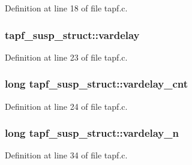 Definition at line 18 of file tapf.\+c.

\subsubsection[{\texorpdfstring{vardelay}{vardelay}}]{ tapf\+\_\+susp\+\_\+struct\+::vardelay}\hypertarget{structtapf__susp__struct_a27dd6d901a5671ea2fc0117f42d63052}{}\label{structtapf__susp__struct_a27dd6d901a5671ea2fc0117f42d63052}


Definition at line 23 of file tapf.\+c.

\subsubsection[{\texorpdfstring{vardelay\+\_\+cnt}{vardelay_cnt}}]{\setlength{\rightskip}{0pt plus 5cm}long tapf\+\_\+susp\+\_\+struct\+::vardelay\+\_\+cnt}\hypertarget{structtapf__susp__struct_a30fa75ef5ade7798e9acfa44fd4d827c}{}\label{structtapf__susp__struct_a30fa75ef5ade7798e9acfa44fd4d827c}


Definition at line 24 of file tapf.\+c.

\subsubsection[{\texorpdfstring{vardelay\+\_\+n}{vardelay_n}}]{\setlength{\rightskip}{0pt plus 5cm}long tapf\+\_\+susp\+\_\+struct\+::vardelay\+\_\+n}\hypertarget{structtapf__susp__struct_a4b42c19983958fe91caf8248f0468a19}{}\label{structtapf__susp__struct_a4b42c19983958fe91caf8248f0468a19}


Definition at line 34 of file tapf.\+c.

